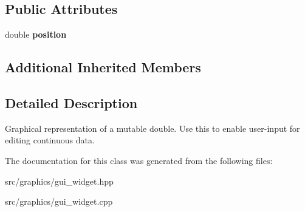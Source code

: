 \subsection*{Public Attributes}
\begin{DoxyCompactItemize}
\item 
\mbox{\label{class_slider_ad699d9f4196d57dc18d1bdfd4d74bf67}} 
double {\bfseries position}
\end{DoxyCompactItemize}
\subsection*{Additional Inherited Members}


\subsection{Detailed Description}
Graphical representation of a mutable double. Use this to enable user-\/input for editing continuous data. 

The documentation for this class was generated from the following files\+:\begin{DoxyCompactItemize}
\item 
src/graphics/gui\+\_\+widget.\+hpp\item 
src/graphics/gui\+\_\+widget.\+cpp\end{DoxyCompactItemize}

